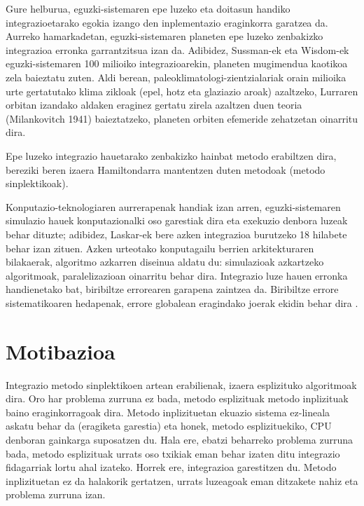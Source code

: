 Gure helburua, eguzki-sistemaren epe luzeko eta doitasun handiko integrazioetarako egokia izango den inplementazio eraginkorra garatzea da. Aurreko hamarkadetan, eguzki-sistemaren planeten epe luzeko zenbakizko integrazioa erronka garrantzitsua izan da. Adibidez, Sussman-ek eta Wisdom-ek  eguzki-sistemaren 100 milioiko integrazioarekin, planeten mugimendua kaotikoa zela baieztatu zuten. Aldi berean, paleoklimatologi-zientzialariak orain milioika urte gertatutako klima zikloak (epel, hotz eta glaziazio aroak) azaltzeko, Lurraren orbitan izandako aldaken eraginez gertatu zirela azaltzen duen teoria (Milankovitch 1941) \cite{Berger2012} baieztatzeko, planeten orbiten efemeride zehatzetan oinarritu dira.        

Epe luzeko integrazio hauetarako zenbakizko hainbat metodo erabiltzen dira, bereziki beren izaera Hamiltondarra mantentzen duten metodoak (metodo sinplektikoak).

Konputazio-teknologiaren aurrerapenak handiak izan arren, eguzki-sistemaren simulazio hauek konputazionalki oso garestiak dira eta exekuzio denbora luzeak behar dituzte; adibidez, Laskar-ek  bere azken integrazioa burutzeko 18 hilabete behar izan zituen.
Azken urteotako konputagailu berrien arkitekturaren bilakaerak, algoritmo azkarren diseinua aldatu du: simulazioak azkartzeko algoritmoak, paralelizazioan oinarritu behar dira. Integrazio luze hauen erronka handienetako bat, biribiltze errorearen garapena zaintzea da. Biribiltze errore sistematikoaren hedapenak, errore globalean eragindako joerak ekidin behar dira \cite{Laskar2015}.
 
\section{Motibazioa}
\label{intro}


Integrazio metodo sinplektikoen artean erabilienak, izaera esplizituko algoritmoak dira. Oro har problema zurruna ez bada, metodo esplizituak  metodo inplizituak baino eraginkorragoak dira. Metodo inplizituetan ekuazio sistema ez-lineala askatu behar da (eragiketa garestia) eta honek, metodo esplizituekiko, CPU denboran gainkarga suposatzen du. Hala ere, ebatzi beharreko problema zurruna bada, metodo esplizituak urrats oso txikiak eman behar izaten ditu integrazio fidagarriak lortu ahal izateko. Horrek ere, integrazioa garestitzen du. Metodo inplizituetan ez da halakorik gertatzen, urrats luzeagoak eman ditzakete nahiz eta problema zurruna izan. 


